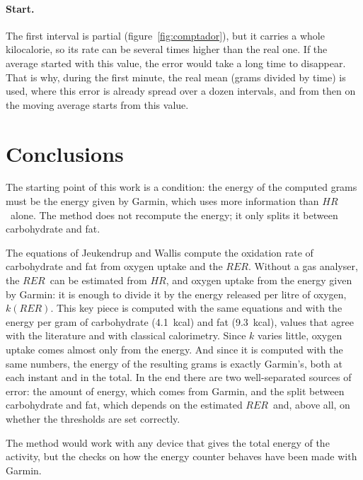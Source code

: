 \documentclass[10pt,a4paper]{article}
\newcommand{\RER}{\ensuremath{\mathit{RER}}}
\newcommand{\FC}{\ensuremath{\mathit{HR}}}
\begin{document}
\paragraph{Start.} The first interval is partial (figure~\ref{fig:comptador}), but it
carries a whole kilocalorie, so its rate can be several times higher than the real one. If
the average started with this value, the error would take a long time to disappear. That is
why, during the first minute, the real mean (grams divided by time) is used, where this
error is already spread over a dozen intervals, and from then on the moving average starts
from this value.

\section{Conclusions}

The starting point of this work is a condition: the energy of the computed grams must be
the energy given by Garmin, which uses more information than \FC\ alone. The method does
not recompute the energy; it only splits it between carbohydrate and fat.

The equations of Jeukendrup and Wallis compute the oxidation rate of carbohydrate and fat
from oxygen uptake and the \RER. Without a gas analyser, the \RER\ can be estimated from
\FC, and oxygen uptake from the energy given by Garmin: it is enough to divide it by the
energy released per litre of oxygen, $k(\RER)$. This key piece is computed with the same
equations and with the energy per gram of carbohydrate (4.1~kcal) and fat (9.3~kcal),
values that agree with the literature and with classical calorimetry. Since $k$ varies
little, oxygen uptake comes almost only from the energy. And since it is computed with the
same numbers, the energy of the resulting grams is exactly Garmin's, both at each instant
and in the total. In the end there are two well-separated sources of error: the amount of
energy, which comes from Garmin, and the split between carbohydrate and fat, which depends
on the estimated \RER\ and, above all, on whether the thresholds are set correctly.

The method would work with any device that gives the total energy of the activity, but the
checks on how the energy counter behaves have been made with Garmin.
\end{document}
